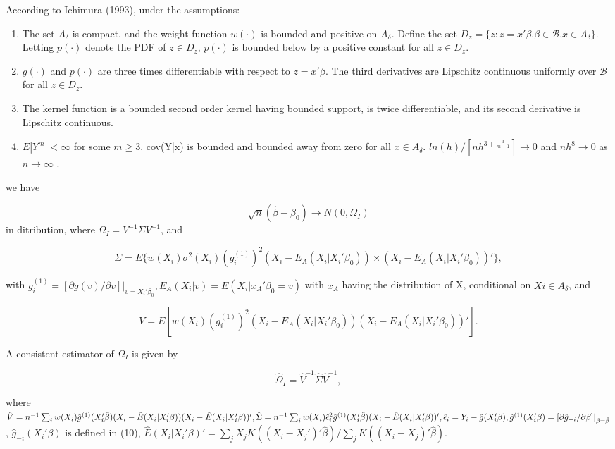 \documentclass[a4paper]{article}
\begin{document}
\begin{theorem}
According to Ichimura (1993), under the assumptions:

\begin{enumerate}
	\item The set $A_\delta$ is compact, and the weight function $w(\cdot)$ is bounded and positive on $A_\delta$. Define the set $D_z = \{ z : z = x'\beta. \beta \in \mathcal{B}$,$ x \in A_\delta\}$. Letting $p(\cdot)$ denote the PDF of $z \in D_z$, $p(\cdot)$ is bounded below by a positive constant for all $z \in D_z$.
	\item $g(\cdot)$ and $p(\cdot)$ are three times differentiable with respect to $z = x'\beta$. The third derivatives are Lipschitz continuous uniformly over $\mathcal{B}$ for all $z \in D_z$.
	\item The kernel function is a bounded second order kernel having bounded support, is twice differentiable, and its second derivative is Lipschitz continuous.
	\item $E|Y^m| < \infty$ for some $m \geq 3$. cov(Y|x) is bounded and bounded away from zero for all $x \in A_\delta$. $ln(h)/[nh^{3 + \frac{3}{m-1}}] \rightarrow 0$ and $nh^8 \rightarrow 0$ as $n \rightarrow \infty $ .
	
\end{enumerate}

we have

\[ \sqrt{n}(\hat{\beta} - \beta_0) \rightarrow N(0,\Omega_I) \] in ditribution, where $\Omega_I = V^{-1}\Sigma V^{-1}$, and

\[\Sigma = E\{w(X_i)\sigma^2(X_i)(g_i^{(1)})^2(X_i - E_A(X_i|X_i'\beta_0)) \times (X_i - E_A(X_i|X_i'\beta_0))'\},\]

with $g_i^{(1)} = [\partial g(v)/\partial v]|_{v = X_i'\beta_0}, E_A(X_i|v) = E(X_i|x_A'\beta_0 = v)$ with $x_A$ having the distribution of X, conditional on $Xi \in A_\delta$, and

\[ V = E[w(X_i)(g_i^{(1)})^2(X_i - E_A(X_i|X_i'\beta_0))(X_i - E_A(X_i|X_i'\beta_0))'].\]

\end{theorem}


A consistent estimator of $\Omega_I$ is given by

\[ \hat{\Omega}_I = \hat{V}^{-1}\hat{\Sigma}\hat{V}^{-1}, \]

where $\hat{V} = n^{-1}\sum_{i} w(X_i)\hat{g}^{(1)}(X_i'\hat{\beta})(X_i - \hat{E}(X_i|X_i'\beta))(X_i - \hat{E}(X_i|X_i'\beta))', \hat{\Sigma} = n^{-1}\sum_{i} w(X_i)\hat{\epsilon}_{i}^{2}\hat{g}^{(1)}(X_i'\hat{\beta})(X_i - \hat{E}(X_i|X_i'\beta))', \hat{\epsilon}_i = Y_i - \hat{g}(X_i'\beta), \hat{g}^{(1)}(X_i'\beta) \linebreak
= [\partial \hat{g}_{-i}/\partial \beta]|_{\beta=\hat{\beta}}$, $\hat{g}_{-i}(X_i'\beta)$ is defined in (10), $\hat{E}(X_i|X_i'\beta)' = \sum_{j} X_jK((X_i - X_j')'\hat{\beta})/ \sum_{j}K((X_i - X_j)'\hat{\beta}).$
\end{document}
